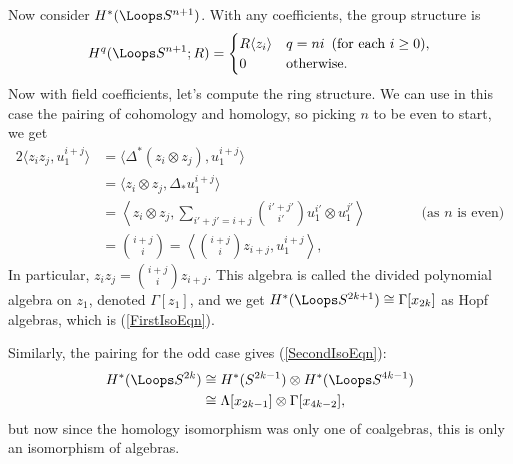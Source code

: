 Now consider $H^* (\Loops S^{n+1})$.  With any coefficients, the group structure is
\[
H^q(\Loops S^{n+1}; R) = \begin{cases} R \langle z_i \rangle & q=ni\textup{ \,(for each $i\geq0$)}, \\ 0 & \mathrm{otherwise}. \end{cases}
\]
Now with field coefficients, let's compute the ring structure.  We can use in this case the pairing of cohomology and homology, so picking $n$ to be even to start, we get
\begin{alignat*}{2}
\langle z_i z_j, u_1^{i+j} \rangle & = \langle \Delta^*(z_i \otimes z_j), u_1^{i+j} \rangle&\qquad& \\
& = \langle z_i \otimes z_j, \Delta_* u_1^{i+j} \rangle \\
& = \left\langle z_i \otimes z_j, \sum_{i'+j'=i+j} {\textstyle\binom{i'+j'}{i'}} u_1^{i'} \otimes u_1^{j'} \right\rangle&&\text{\ (as $n$ is even)} \\
& = {\textstyle\binom{i+j}{i}} = \left\langle {\textstyle\binom{i+j}{i}} z_{i+j}, u_1^{i+j} \right\rangle,
\end{alignat*}
In particular, $z_i z_j = \binom{i+j}{i} z_{i+j}$. This algebra is called the divided polynomial algebra on $z_1$, denoted $\Gamma[z_1]$, and we get $H^* (\Loops S^{2k+1}) \cong \Gamma[x_{2k}]$ as Hopf algebras, which is (\ref{FirstIsoEqn}).

Similarly, the pairing for the odd case gives (\ref{SecondIsoEqn}):
\begin{align*}
H^* (\Loops S^{2k}) & \cong H^* (S^{2k-1}) \otimes H^* (\Loops S^{4k-1}) \\
& \cong \Lambda[x_{2k-1}] \otimes \Gamma[x_{4k-2}],
\end{align*}
but now since the homology isomorphism was only one of coalgebras, this is only an isomorphism of algebras.

